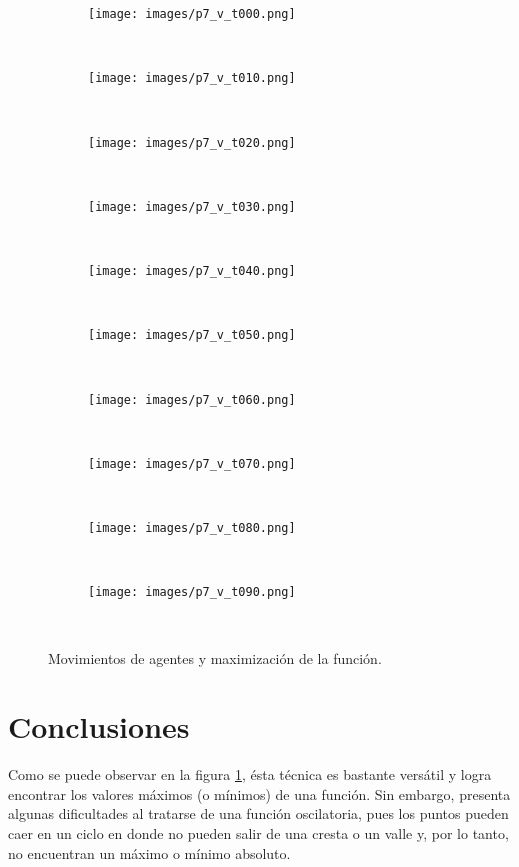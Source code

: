 \documentclass{article}
\begin{document}
\begin{figure}
     \begin{subfigure}[b]{0.3\textwidth}
         \centering
         \texttt{[image: images/p7\_v\_t000.png]}
         \caption{\ }
     \end{subfigure}
     \begin{subfigure}[b]{0.3\textwidth}
         \centering
         \texttt{[image: images/p7\_v\_t010.png]}
         \caption{\ }
     \end{subfigure}
     \begin{subfigure}[b]{0.3\textwidth}
         \centering
         \texttt{[image: images/p7\_v\_t020.png]}
         \caption{\ }
     \end{subfigure}
     \begin{subfigure}[b]{0.3\textwidth}
         \centering
         \texttt{[image: images/p7\_v\_t030.png]}
         \caption{\ }
     \end{subfigure}
     \begin{subfigure}[b]{0.3\textwidth}
         \centering
         \texttt{[image: images/p7\_v\_t040.png]}
         \caption{\ }
     \end{subfigure}
     \begin{subfigure}[b]{0.3\textwidth}
         \centering
         \texttt{[image: images/p7\_v\_t050.png]}
         \caption{\ }
     \end{subfigure}
     \begin{subfigure}[b]{0.3\textwidth}
         \centering
         \texttt{[image: images/p7\_v\_t060.png]}
         \caption{\ }
     \end{subfigure}
     \begin{subfigure}[b]{0.3\textwidth}
         \centering
         \texttt{[image: images/p7\_v\_t070.png]}
         \caption{\ }
     \end{subfigure}
     \begin{subfigure}[b]{0.3\textwidth}
         \centering
         \texttt{[image: images/p7\_v\_t080.png]}
         \caption{\ }
     \end{subfigure}
     \begin{subfigure}[b]{0.3\textwidth}
         \centering
         \texttt{[image: images/p7\_v\_t090.png]}
         \caption{\ }
     \end{subfigure}
     \caption{Movimientos de agentes y maximizaci\'on de la funci\'on.}
     \label{fig1}
\end{figure}
\newpage
\section{Conclusiones}\label{con}
Como se puede observar en la figura \ref{fig1}, \'esta t\'ecnica es bastante vers\'atil y logra encontrar los valores m\'aximos (o m\'inimos) de una funci\'on. Sin embargo, presenta algunas dificultades al tratarse de una funci\'on oscilatoria, pues los puntos pueden caer en un ciclo en donde no pueden salir de una cresta o un valle y, por lo tanto, no encuentran un m\'aximo o m\'inimo absoluto.



\end{document}

